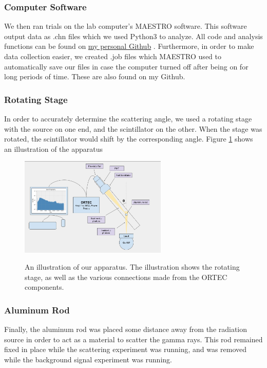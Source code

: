 \documentclass[10pt,letterpaper,onecolumn]{article}
\begin{document}
\subsubsection{Computer Software}
We then ran trials on the lab computer's MAESTRO software. This software output data as .chn files which we used Python3 to analyze. All code and analysis functions can be found on \href{https://github.com/adeshpande03/seniorlab}{my personal Github} \cite{adesh}. Furthermore, in order to make data collection easier, we created .job files which MAESTRO used to automatically save our files in case the computer turned off after being on for long periods of time. These are also found on my Github.
\subsubsection{Rotating Stage}
In order to accurately determine the scattering angle, we used a rotating stage with the source on one end, and the scintillator on the other. When the stage was rotated, the scintillator would shift by the corresponding angle. Figure \ref{fig:stage} shows an illustration of the apparatus
\begin{figure}[hbt!]
    \begin{center}
        {{\includegraphics[width=7cm]{Setup.png} }}%
        \caption{An illustration of our apparatus. The illustration shows the rotating stage, as well as the various connections made from the ORTEC components.}%
        \label{fig:stage}%
    \end{center}
\end{figure}
\subsubsection{Aluminum Rod}
Finally, the aluminum rod was placed some distance away from the radiation source in order to act as a material to scatter the gamma rays. This rod remained fixed in place while the scattering experiment was running, and was removed while the background signal experiment was running.
\end{document}
